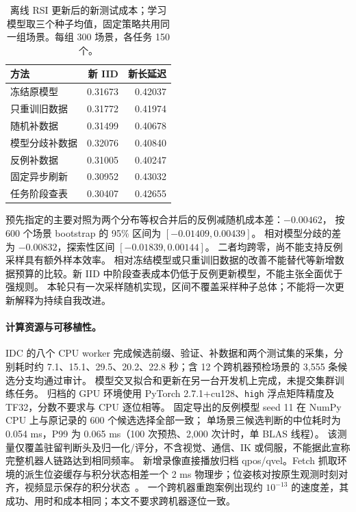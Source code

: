 \documentclass{article}
\begin{document}
\begin{table}[t]
\centering\small
\caption{离线 RSI 更新后的新测试成本；学习模型取三个种子均值，固定策略共用同一组场景。每组 300 场景，各任务 150 个。}
\begin{tabular}{lrr}\toprule
方法 & 新 IID & 新长延迟 \\\midrule
冻结原模型 & 0.31673 & 0.42037 \\
只重训旧数据 & 0.31772 & 0.41974 \\
随机补数据 & 0.31499 & 0.40678 \\
模型分歧补数据 & 0.32076 & 0.40840 \\
反例补数据 & 0.31005 & 0.40247 \\
固定异步刷新 & 0.30952 & 0.43032 \\
任务阶段查表 & 0.30407 & 0.42655 \\\bottomrule
\end{tabular}
\end{table}

预先指定的主要对照为两个分布等权合并后的反例减随机成本差：$-0.00462$，
按 600 个场景 bootstrap 的 95\% 区间为 $[-0.01409,0.00439]$。
相对模型分歧的差为 $-0.00832$，探索性区间 $[-0.01839,0.00144]$。
二者均跨零，尚不能支持反例采样具有额外样本效率。
相对冻结模型或只重训旧数据的改善不能替代等新增数据预算的比较。新 IID 中阶段查表成本仍低于反例更新模型，不能主张全面优于强规则。
本轮只有一次采样随机实现，区间不覆盖采样种子总体；不能将一次更新解释为持续自我改进。

\paragraph{计算资源与可移植性。}
IDC 的八个 CPU worker 完成候选前缀、验证、补数据和两个测试集的采集，分别耗时约
7.1、15.1、29.5、20.2、22.8 秒；含 12 个跨机器预检场景的 3,555 条候选分支均通过审计。
模型交叉拟合和更新在另一台开发机上完成，未提交集群训练任务。
归档的 GPU 环境使用 PyTorch 2.7.1+cu128、\texttt{high} 浮点矩阵精度及 TF32，分数不要求与 CPU 逐位相等。
固定导出的反例模型 seed 11 在 NumPy CPU 上与原记录的 600 个候选选择全部一致；
单场景三候选判断的中位耗时为 0.054 ms，P99 为 0.065 ms（100 次预热、2,000 次计时，单 BLAS 线程）。
该测量仅覆盖驻留判断头及归一化/评分，不含视觉、通信、IK 或伺服，不能据此宣称完整机器人链路达到相同频率。
新增录像直接播放归档 qpos/qvel。Fetch 抓取环境的派生位姿缓存与积分状态相差一个 2 ms 物理步；位姿核对按原生观测时刻对齐，视频显示保存的积分状态~\citep{mujoco2026simulation}。
一个跨机器重跑案例出现约 $10^{-13}$ 的速度差，其成功、用时和成本相同；本文不要求跨机器逐位一致。
\end{document}
